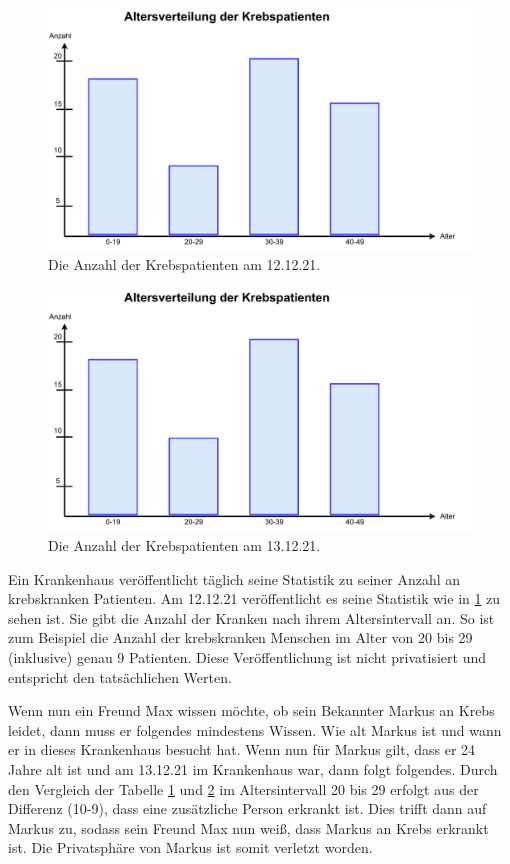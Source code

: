 \begin{figure}[htbp]
	\centering
	\includegraphics[scale=0.4]{./images/age_cancer_9.pdf}
	\caption{Die Anzahl der Krebspatienten am 12.12.21.}
	\label{fig:age_cancer_9}
\end{figure}
\begin{figure}[htbp]
	\centering
	\includegraphics[scale=0.4]{./images/age_cancer_10.pdf}
	\caption{Die Anzahl der Krebspatienten am 13.12.21.}
	\label{fig:age_cancer_10}
\end{figure}

Ein Krankenhaus veröffentlicht täglich seine Statistik zu seiner Anzahl an krebskranken Patienten. Am 12.12.21 veröffentlicht es seine Statistik wie in \cref{fig:age_cancer_9} zu sehen ist. Sie gibt die Anzahl der Kranken nach ihrem Altersintervall an. So ist zum Beispiel die Anzahl der krebskranken Menschen im Alter von 20 bis 29 (inklusive) genau 9 Patienten. Diese Veröffentlichung ist nicht privatisiert und entspricht den tatsächlichen Werten. 

Wenn nun ein Freund Max wissen möchte, ob sein Bekannter Markus an Krebs leidet, dann muss er folgendes mindestens Wissen. Wie alt Markus ist und wann er in dieses Krankenhaus besucht hat. Wenn nun für Markus gilt, dass er 24 Jahre alt ist und am 13.12.21 im Krankenhaus war, dann folgt folgendes. Durch den Vergleich der Tabelle \cref{fig:age_cancer_9} und \cref{fig:age_cancer_10} im Altersintervall 20 bis 29 erfolgt aus der Differenz (10-9), dass eine zusätzliche Person erkrankt ist. Dies trifft dann auf Markus zu, sodass sein Freund Max nun weiß, dass Markus an Krebs erkrankt ist. Die Privatsphäre von Markus ist somit verletzt worden.


